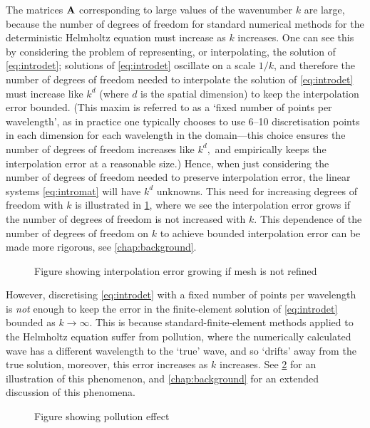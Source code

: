 The matrices $\mathbf{A}$ corresponding to large values of the wavenumber $k$ are large, because the number of degrees of freedom for standard numerical methods for the deterministic Helmholtz equation must increase as $k$ increases. One can see this by considering the problem of representing, or interpolating, the solution of \eqref{eq:introdet}; solutions of \eqref{eq:introdet} oscillate on a scale $1/k$, and therefore the number of degrees of freedom needed to interpolate the solution of \eqref{eq:introdet} must increase like $k^d$ (where $d$ is the spatial dimension) to keep the interpolation error bounded. (This maxim is referred to as a `fixed number of points per wavelength', as in practice one typically chooses to use 6--10 discretisation points in each dimension for each wavelength in the domain---this choice ensures the number of degrees of freedom increases like $k^d,$ and empirically keeps the interpolation error at a reasonable size.) Hence, when just considering the number of degrees of freedom needed to preserve interpolation error, the linear systems \eqref{eq:intromat} will have $k^d$ unknowns. This need for increasing degrees of freedom with $k$ is illustrated in \cref{fig:introinterp}, where we see the interpolation error grows if the number of degrees of freedom is not increased with $k$. This dependence of the number of degrees of freedom on $k$ to achieve bounded interpolation error can be made more rigorous, see \cref{chap:background}.

\begin{figure}
\caption{\label{fig:introinterp} Figure showing interpolation error growing if mesh is not refined}
\end{figure}

However, discretising \eqref{eq:introdet} with a fixed number of points per wavelength is \emph{not} enough to keep the error in the finite-element solution of \eqref{eq:introdet} bounded as $k\rightarrow \infty.$ This is because standard-finite-element methods applied to the Helmholtz equation suffer from pollution, where the numerically calculated wave has a different wavelength to the `true' wave, and so `drifts' away from the true solution, moreover, this error increases as $k$ increases. See \cref{fig:intropoll} for an illustration of this phenomenon, and \cref{chap:background} for an extended discussion of this phenomena.

\begin{figure}
\caption{\label{fig:intropoll} Figure showing pollution effect}
\end{figure}

